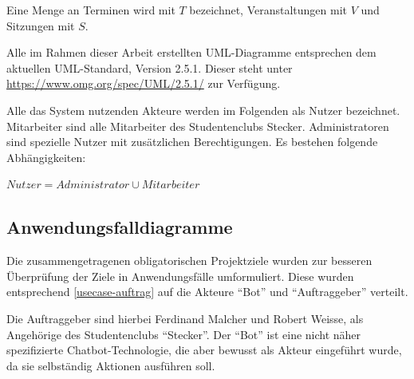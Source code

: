 Eine Menge an Terminen wird mit $T$ bezeichnet, Veranstaltungen mit $V$ und Sitzungen mit $S$.

Alle im Rahmen dieser Arbeit erstellten UML-Diagramme entsprechen dem aktuellen UML-Standard, Version 2.5.1. Dieser steht unter \url{https://www.omg.org/spec/UML/2.5.1/} zur Verfügung.

Alle das System nutzenden Akteure werden im Folgenden als Nutzer bezeichnet. Mitarbeiter sind alle Mitarbeiter des Studentenclubs Stecker. Administratoren sind spezielle Nutzer mit zusätzlichen Berechtigungen.
Es bestehen folgende Abhängigkeiten: 

$Nutzer = Administrator \cup Mitarbeiter$ 

\subsection{Anwendungsfalldiagramme}


Die zusammengetragenen obligatorischen Projektziele wurden zur besseren Überprüfung der Ziele in Anwendungsfälle umformuliert. Diese wurden entsprechend \autoref{usecase-auftrag} auf die Akteure \enquote{Bot} und \enquote{Auftraggeber} verteilt.

Die Auftraggeber sind hierbei Ferdinand Malcher und Robert Weisse, als Angehörige des Studentenclubs \enquote{Stecker}. Der \enquote{Bot} ist eine nicht näher spezifizierte Chatbot-Technologie, die aber bewusst als Akteur eingeführt wurde, da sie selbständig Aktionen ausführen soll.

